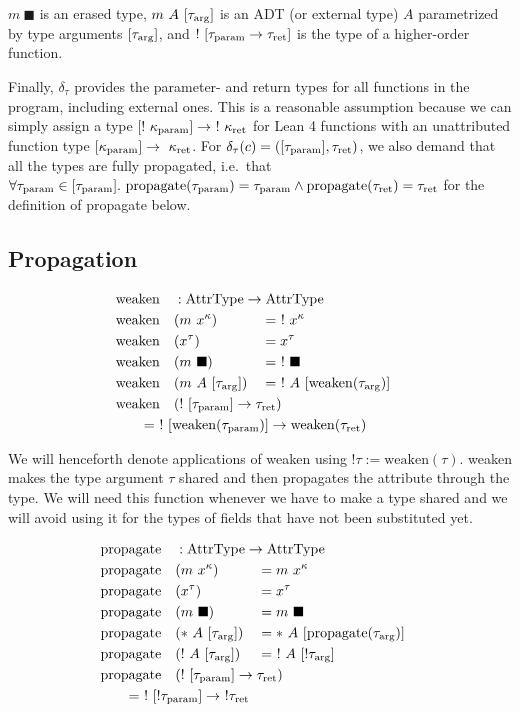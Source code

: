 $m\ \blacksquare$ is an erased type, $m\ A\ [\tau_{\mathrm{arg}}]$ is an ADT (or external type) $A$ parametrized by type arguments $[\tau_{\mathrm{arg}}]$, and $!\ [\tau_{\mathrm{param}} \to \tau_{\mathrm{ret}}]$ is the type of a higher-order function. 

Finally, $\delta_\tau$ provides the parameter- and return types for all functions in the program, including external ones. This is a reasonable assumption because we can simply assign a type $[!\ \kappa_\param] \to \ !\ \kappa_\ret$ for Lean 4 functions with an unattributed function type $[\kappa_{\mathrm{param}}] \to \ \kappa_{\mathrm{ret}}$. For $\delta_\tau(c) = ([\tau_{\mathrm{param}}], \tau_{\mathrm{ret}})$, we also demand that all the types are fully propagated, i.e.\ that $\forall \tau_{\mathrm{param}} \in [\tau_{\mathrm{param}}].\ \mathrm{propagate}(\tau_{\mathrm{param}}) = \tau_{\mathrm{param}} \land \mathrm{propagate}(\tau_{\mathrm{ret}}) = \tau_{\mathrm{ret}}$ for the definition of propagate below.

\subsection{Propagation}

\newcommand{\weaken}{\mathrm{weaken}}
\newcommand{\rebreak}[1]{\mathrlap{\qquad#1}}

\begin{alignat*}{3}
  &\weaken &&: \mathrlap{\AttrType \to \AttrType} \\
  &\weaken&&(m\ x^\kappa) &&=\ !\ x^\kappa \\
  &\weaken&&(x^\tau) &&= x^\tau \\
  &\weaken&&(m\ \blacksquare) &&=\ !\ \blacksquare \\
  &\weaken&&(m\ A\ [\tau_\arrg]) &&=\ !\ A\ [\weaken(\tau_\arrg)] \\
  &\weaken&&\mathrlap{(!\ [\tau_\param] \to \tau_\ret)} \\
  &\rebreak{= \ !\ [\weaken(\tau_\param)] \to \weaken(\tau_\ret)}
\end{alignat*}

We will henceforth denote applications of weaken using $!\tau := \weaken(\tau)$. weaken makes the type argument $\tau$ shared and then propagates the attribute through the type. We will need this function whenever we have to make a type shared and we will avoid using it for the types of fields that have not been substituted yet.

\newcommand{\propagate}{\mathrm{propagate}}

\begin{alignat*}{3}
  &\propagate &&: \mathrlap{\AttrType \to \AttrType} \\
  &\propagate&&(m\ x^\kappa) &&= m\ x^\kappa \\
  &\propagate&&(x^\tau) &&= x^\tau \\
  &\propagate&&(m\ \blacksquare) &&= m\ \blacksquare \\
  &\propagate&&(*\ A\ [\tau_\arrg]) &&= *\ A\ [\propagate(\tau_\arrg)] \\
  &\propagate&&(!\ A\ [\tau_\arrg]) &&= \ !\ A\ [!\tau_\arrg] \\
  &\propagate&&\mathrlap{(!\ [\tau_\param] \to \tau_\ret)} \\
  &\rebreak{= \ !\ [!\tau_\param] \to\ !\tau_\ret}
\end{alignat*}

